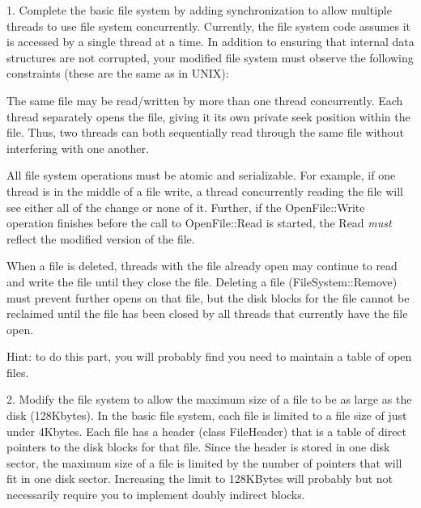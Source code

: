 \begin{description}
\item{1.}
Complete the basic file system by adding synchronization to
allow multiple threads to use file system concurrently.  Currently,
the file system code assumes it is accessed by a single thread at a time.
In addition to ensuring that internal
data structures are not corrupted, your modified file system must
observe the following constraints (these are the same as in UNIX):

\begin{description}
\item The same file may be read/written by more than
one thread concurrently.  Each thread separately opens the file,
giving it its own private seek position within the file.
Thus, two threads can both sequentially read through the same file
without interfering with one another.

\item All file system operations must be atomic and serializable.
For example, if one thread is in the middle of a file write,
a thread concurrently reading the file will see either all of the change or
none of it.  Further, if the OpenFile::Write operation finishes
before the call to OpenFile::Read is started, the Read {\em must} reflect
the modified version of the file.

\item When a file is deleted, threads with the file already open
may continue to read and write the file until they close the file.
Deleting a file (FileSystem::Remove) must prevent further opens on
that file, but the disk blocks for the file cannot be reclaimed
until the file has been closed by all threads that currently have the
file open.

\end{description}

Hint: to do this part, you will probably find you need to maintain
a table of open files.

\item{2.}
Modify the file system to allow the maximum size of a file to be as large
as the disk (128Kbytes).  In the basic file system, each file is limited
to a file size of just under 4Kbytes.  Each file has a header
(class FileHeader) that is a table of direct pointers to the disk blocks
for that file.  Since the header is stored in one disk sector, the
maximum size of a file is limited by the number of pointers that will
fit in one disk sector.  Increasing the limit to 128KBytes will probably
but not necessarily require you to implement doubly indirect blocks.


\end{description}
